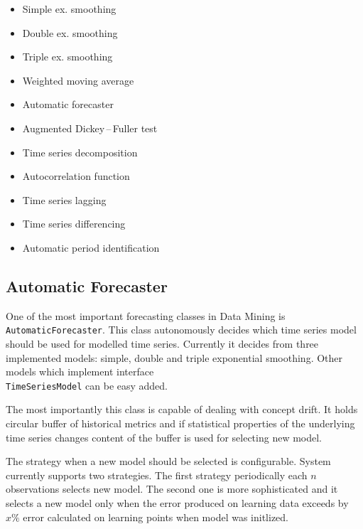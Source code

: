     \begin{multicols}{2}
        \begin{itemize}
            \item Simple ex. smoothing
            \item Double ex. smoothing
            \item Triple ex. smoothing
            \item Weighted moving average
            \item Automatic forecaster
            \item Augmented Dickey\,--\,Fuller test
            \item Time series decomposition
            \item Autocorrelation function
            \item Time series lagging
            \item Time series differencing
            \item Automatic period identification
        \end{itemize}
    \end{multicols}

        \subsection{Automatic Forecaster}
        One of the most important forecasting classes in Data Mining is \\\texttt{AutomaticForecaster}. This class
        autonomously decides which time series model should be used for modelled time series. Currently it decides from
        three implemented models: simple, double and triple exponential smoothing. Other models which implement
        interface \\\texttt{TimeSeriesModel} can be easy added.

        The most importantly this class is capable of dealing with concept drift. It holds circular buffer of historical
        metrics and if statistical properties of the underlying time series changes content of the buffer is used for
        selecting new model.

        The strategy when a new model should be selected is configurable. System currently
        supports two strategies. The first strategy periodically each $n$ observations selects new model.
        The second one is more sophisticated and it selects a new model only when the error produced on learning data
        exceeds by $x\%$ error calculated on learning points when model was initlized.

